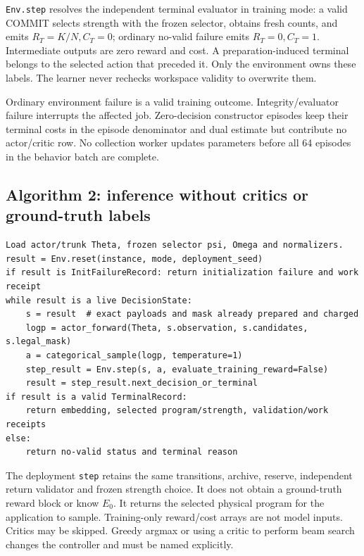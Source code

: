 \documentclass[10pt,a4paper]{article}
\begin{document}
\texttt{Env.step} resolves the independent terminal evaluator in
training mode: a valid COMMIT selects strength with the frozen selector,
obtains fresh counts, and emits \(R_T=K/N,C_T=0\); ordinary no-valid
failure emits \(R_T=0,C_T=1\). Intermediate outputs are zero reward and
cost. A preparation-induced terminal belongs to the selected action that
preceded it. Only the environment owns these labels. The learner never
rechecks workspace validity to overwrite them.

Ordinary environment failure is a valid training outcome.
Integrity/evaluator failure interrupts the affected job. Zero-decision
constructor episodes keep their terminal costs in the episode
denominator and dual estimate but contribute no actor/critic row. No
collection worker updates parameters before all 64 episodes in the
behavior batch are complete.


\hypertarget{algorithm-2-inference-without-critics-or-ground-truth-labels}{%
\subsection{Algorithm 2: inference without critics or ground-truth
labels}\label{algorithm-2-inference-without-critics-or-ground-truth-labels}}

\begin{verbatim}
Load actor/trunk Theta, frozen selector psi, Omega and normalizers.
result = Env.reset(instance, mode, deployment_seed)
if result is InitFailureRecord: return initialization failure and work receipt
while result is a live DecisionState:
    s = result  # exact payloads and mask already prepared and charged
    logp = actor_forward(Theta, s.observation, s.candidates, s.legal_mask)
    a = categorical_sample(logp, temperature=1)
    step_result = Env.step(s, a, evaluate_training_reward=False)
    result = step_result.next_decision_or_terminal
if result is a valid TerminalRecord:
    return embedding, selected program/strength, validation/work receipts
else:
    return no-valid status and terminal reason
\end{verbatim}

The deployment \texttt{step} retains the same transitions, archive,
reserve, independent return validator and frozen strength choice. It
does not obtain a ground-truth reward block or know \(E_0\). It returns
the selected physical program for the application to sample.
Training-only reward/cost arrays are not model inputs. Critics may be
skipped. Greedy argmax or using a critic to perform beam search changes
the controller and must be named explicitly.
\end{document}

